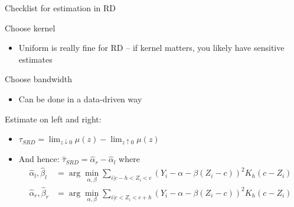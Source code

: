 \documentclass[notes,11pt, aspectratio=169]{beamer}
\newenvironment{wideitemize}{\itemize\addtolength{\itemsep}{10pt}}{\enditemize}
\begin{document}
\begin{frame}{Checklist for estimation in RD}
  \begin{wideitemize}
  \item Choose kernel
    \begin{itemize}
    \item Uniform is really fine for RD -- if kernel matters, you likely have sensitive estimates
    \end{itemize}
  \item Choose bandwidth
    \begin{itemize}
    \item Can be done in a data-driven way
    \end{itemize}
  \item Estimate on left and right:
    \begin{itemize}
    \item $\tau_{SRD} = \lim_{z \downarrow 0} \mu(z) - \lim_{z \uparrow 0}  \mu(z)$
    \item And hence: $\hat{\tau}_{SRD} = \hat{\alpha}_{r} - \hat{\alpha}_{l}$ where
      \begin{align*}
        \hat{\alpha}_{l},\hat{\beta}_{l} &= \arg \min_{\alpha, \beta}\sum_{i | c-h < Z_{i} < c} (Y_{i} - \alpha - \beta (Z_{i} - c))^{2} K_{h}(c - Z_{i})\\
        \hat{\alpha}_{r},\hat{\beta}_{r}   &= \arg \min_{\alpha, \beta}\sum_{i | c < Z_{i} < c+h} (Y_{i} - \alpha - \beta (Z_{i} - c))^{2} K_{h}(c - Z_{i})\\
      \end{align*}
      
    \end{itemize}
  \end{wideitemize}
\end{frame}
\end{document}
